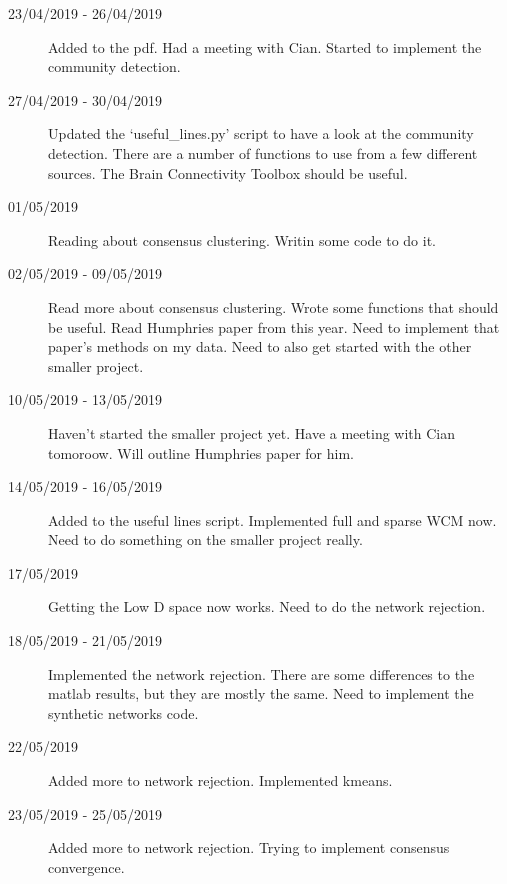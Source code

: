 \documentclass[a4paper,12pt]{article}
\theoremstyle{definition}
\begin{document}
\begin{description}
                                \item[23/04/2019 - 26/04/2019] Added to the pdf. Had a meeting with Cian. Started to implement the community detection.

                                \item[27/04/2019 - 30/04/2019] Updated the `useful\_lines.py' script to have a look at the community detection. There are a number of functions to use from a few different sources. The Brain Connectivity Toolbox should be useful.
                                
                                \item[01/05/2019] Reading about consensus clustering. Writin some code to do it.

                                \item[02/05/2019 - 09/05/2019] Read more about consensus clustering. Wrote some functions that should be useful. Read Humphries paper from this year. Need to implement that paper's methods on my data. Need to also get started with the other smaller project.

                                \item[10/05/2019 - 13/05/2019] Haven't started the smaller project yet. Have a meeting with Cian tomoroow. Will outline Humphries paper for him.

                                \item[14/05/2019 - 16/05/2019] Added to the useful lines script. Implemented full and sparse WCM now. Need to do something on the smaller project really.

                                \item[17/05/2019] Getting the Low D space now works. Need to do the network rejection.

                                \item[18/05/2019 - 21/05/2019] Implemented the network rejection. There are some differences to the matlab results, but they are mostly the same. Need to implement the synthetic networks code.

                                \item[22/05/2019] Added more to network rejection. Implemented kmeans.

                                \item[23/05/2019 - 25/05/2019] Added more to network rejection. Trying to implement consensus convergence.
                                

\end{description}
\end{document}

